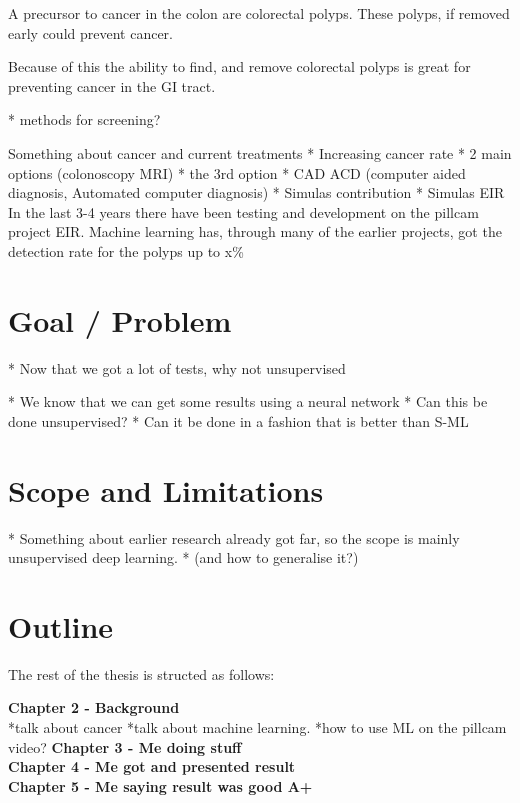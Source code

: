 \documentclass[a4paper,english]{ifimaster}
\begin{document}
	A precursor to cancer in the colon are colorectal polyps. These polyps, if removed early could prevent 
	cancer. 
		
	
	Because of this the ability to find, and remove colorectal polyps is great for preventing cancer in the GI tract. 
	
	* methods for screening?
	
	
		
		Something about cancer and current treatments 
		* Increasing cancer rate
		* 2 main options (colonoscopy MRI)
		* the 3rd option
		* CAD ACD (computer aided diagnosis, Automated computer diagnosis)
		* Simulas contribution
		* Simulas EIR
	In the last 3-4 years there have been testing and development on the pillcam project EIR. Machine learning has, through 
	many of the earlier projects, got the detection rate for the polyps up to x\% %
	
	
	\section{Goal / Problem}
		* Now that we got a lot of tests, why not unsupervised

		* We know that we can get some results using a neural network
		* Can this be done unsupervised?
		* Can it be done in a fashion that is better than S-ML
		 
		
		
	\section{Scope and Limitations}
		* Something about earlier research already got far, so the scope is mainly unsupervised deep learning.
		* (and how to generalise it?)
		
	
		

	\section{Outline}
	The rest of the thesis is structed as follows:
	
	\textbf{Chapter 2 - Background}\\
	*talk about cancer
	*talk about machine learning.
	*how to use ML on the pillcam video?
	\textbf{Chapter 3 - Me doing stuff}\\
	\textbf{Chapter 4 - Me got and presented result}\\
	\textbf{Chapter 5 - Me saying result was good A+}\\
	
\end{document}
